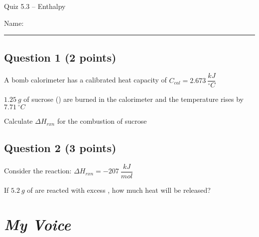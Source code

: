 \documentclass[11pt, letterpaper]{memoir}
\begin{document}
	\begin{center}
		{\large	Quiz 5.3 -- Enthalpy}
	\end{center}
{\large Name: \rule[-1mm]{4in}{.1pt}
	
	\subsection*{Question 1 (2 points)}
	A bomb calorimeter has a calibrated heat capacity of $C_{cal}=2.673~\dfrac{kJ}{^\circ C}$
	
	\noindent
	$1.25~g$ of sucrose () are burned in the calorimeter and the temperature rises by $7.71~^\circ C$
	
	\noindent
	Calculate $\Delta H_{rxn}$ for the combustion of sucrose
	
	
	\vspace{15em}
	\subsection*{Question 2 (3 points)}
	Consider the reaction:  \hspace{2em} $\Delta H_{rxn} = -207~\dfrac{kJ}{mol}$
	
	\noindent
	If $5.2~g$ of  are reacted with excess , how much heat will be released?

\newpage
\pagestyle{empty}
\addtocounter{page}{-1}
\section*{\emph{My Voice}}
}
\end{document}
